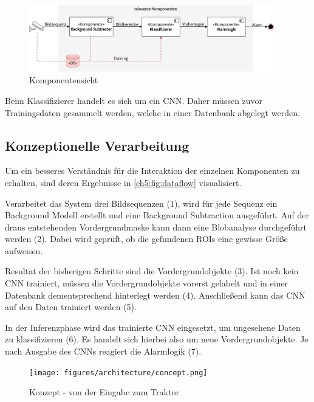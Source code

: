 \begin{figure}[ht]
    \begin{small}
        \begin{center}
            \includegraphics[width=0.95\textwidth]{figures/architecture/components.png}
        \end{center}
        \caption{Komponentensicht}
        \label{ch5:fig:components}
    \end{small}
\end{figure}

Beim Klassifizierer handelt es sich um ein \ac{CNN}.
Daher müssen zuvor Trainingsdaten gesammelt werden, welche in einer Datenbank abgelegt werden.

\subsection{Konzeptionelle Verarbeitung} \label{ch5:concept}
Um ein besseres Verständnis für die Interaktion der einzelnen Komponenten zu erhalten, sind deren Ergebnisse in \autoref{ch5:fig:dataflow} visualisiert.

Verarbeitet das System drei Bildsequenzen (1), wird für jede Sequenz ein Background Modell erstellt und eine Background Subtraction ausgeführt.
Auf der draus entstehenden Vordergrundmaske kann dann eine Blobanalyse durchgeführt werden (2).
Dabei wird geprüft, ob die gefundenen \acp{ROI} eine gewisse Größe aufweisen.

Resultat der bisherigen Schritte sind die Vordergrundobjekte (3).
Ist noch kein \ac{CNN} trainiert, müssen die Vordergrundobjekte vorerst gelabelt und in einer Datenbank dementsprechend hinterlegt werden (4).
Anschließend kann das \ac{CNN} auf den Daten trainiert werden (5).

In der Inferenzphase wird das trainierte \ac{CNN} eingesetzt, um ungesehene Daten zu klassifizieren (6).
Es handelt sich hierbei also um neue Vordergrundobjekte.
Je nach Ausgabe des \ac{CNN}s reagiert die Alarmlogik (7).

\begin{figure}[ht]
    \begin{small}
        \begin{center}
            \texttt{[image: figures/architecture/concept.png]}
        \end{center}
        \caption{Konzept - von der Eingabe zum Traktor}
        \label{ch5:fig:dataflow}
    \end{small}
\end{figure}

